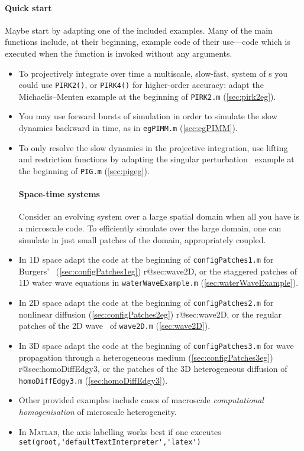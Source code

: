 \paragraph{Quick start}
Maybe start by adapting one of the included examples. 
Many of the main functions include, at their beginning, example code of their use---code which is executed when the function is invoked without any arguments.
\begin{itemize}
\item To projectively integrate over time a multiscale, slow-fast, system of \ode{}s you could use \verb|PIRK2()|, or \verb|PIRK4()| for higher-order accuracy: adapt the Michaelis--Menten example at the beginning of \verb|PIRK2.m| (\cref{sec:pirk2eg}).
\item You may use forward bursts of simulation in order to simulate the slow dynamics backward in time, as in \verb|egPIMM.m| (\cref{sec:egPIMM}).
\item To only resolve the slow dynamics in the projective integration, use lifting and restriction functions by adapting the singular perturbation \ode\ example at the beginning of \verb|PIG.m| (\cref{sec:pigeg}).

\paragraph{Space-time systems}
Consider an evolving system over a large spatial domain when all you have is a microscale code.  
To efficiently simulate over the large domain, one can simulate in just small patches of the domain, appropriately coupled.
\item In 1D space adapt the code at the beginning of \verb|configPatches1.m| for Burgers' \pde\ (\cref{sec:configPatches1eg})%
\ifcsname r@sec:wave2D\endcsname, or the staggered patches of 1D water wave equations in \verb|waterWaveExample.m| (\cref{sec:waterWaveExample})\fi.

\item In 2D space adapt the code at the beginning of \verb|configPatches2.m| for nonlinear diffusion (\cref{sec:configPatches2eg})%
\ifcsname r@sec:wave2D\endcsname, or the regular patches of the 2D wave \pde\ of \verb|wave2D.m| (\cref{sec:wave2D})\fi.

\item In 3D space adapt the code at the beginning of \verb|configPatches3.m| for wave propagation through a heterogeneous medium (\cref{sec:configPatches3eg})%
\ifcsname r@sec:homoDiffEdgy3\endcsname, or the patches of the 3D heterogeneous diffusion of \verb|homoDiffEdgy3.m| (\cref{sec:homoDiffEdgy3})\fi.

\item Other provided examples include cases of macroscale \emph{computational homogenisation} of microscale heterogeneity.

\item In \textsc{Matlab}, the axis labelling works best if one executes
\\\verb|set(groot,'defaultTextInterpreter','latex')|
\end{itemize}



